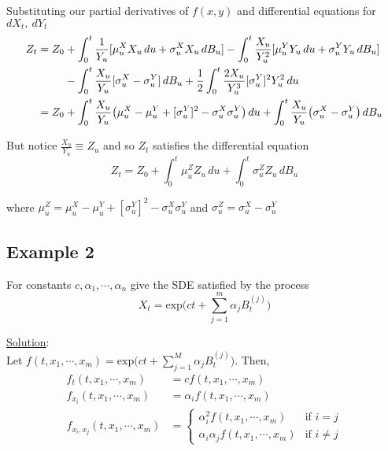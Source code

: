 \documentclass[12pt]{article}
\begin{document}
Substituting our partial derivatives of $f(x,y)$ and differential equations for $dX_t,~dY_t$
\begin{align*}
	Z_t &= Z_0 + \int^t_0 \frac{1}{Y_u}[\mu^X_u X_u\,du + \sigma^X_u X_u\,dB_u] - \int^t_0 \frac{X_u}{Y_u^2}[\mu^Y_u Y_u\,du + \sigma^Y_u Y_u\,dB_u] \\
	&\hphantom{{}={Z_0}} - \int^t_0\frac{X_u}{Y_u}[\sigma^X_u - \sigma^Y_u]\,dB_u + \frac{1}{2}\int^t_0\frac{2X_u}{Y_u^3}[\sigma^Y_u]^2Y_u^2\,du \\
	&= Z_0 + \int^t_0 \frac{X_u}{Y_u}\big(\mu^X_u - \mu^Y_u + [\sigma^Y_u]^2 - \sigma^X_u\sigma^Y_u\big)\,du + \int^t_0 \frac{X_u}{Y_u}\big(\sigma^X_u - \sigma^Y_u\big)\,dB_u
\end{align*}

But notice $\frac{X_u}{Y_u} \equiv Z_u$ and so $Z_t$ satisfies the differential equation
\begin{equation*}
	Z_t = Z_0 + \int^t_0\mu^Z_u Z_u\,du + \int^t_0 \sigma^Z_u Z_u\,dB_u
\end{equation*}

where $\mu^Z_u = \mu^X_u - \mu^Y_u + [\sigma^Y_u]^2 - \sigma^X_u\sigma^Y_u$ and $\sigma^Z_u = \sigma^X_u - \sigma^Y_u$


\subsection{Example 2}

For constants $c,\alpha_1,\cdots,\alpha_n$ give the SDE satisfied by the process
\begin{equation*}
	X_t = \mathrm{exp}\Big(ct + \sum^m_{j=1}\alpha_jB^{(j)}_t \Big)
\end{equation*}

\underline{Solution}: \\

Let $f(t,x_1,\cdots,x_m) = \mathrm{exp}\Big(ct + \sum^M_{j=1}\alpha_jB^{(j)}_t \Big)$. Then,
\begin{align*}
	f_t(t,x_1,\cdots,x_m) &= cf(t,x_1,\cdots,x_m) \\
	f_{x_i}(t,x_1,\cdots,x_m) &= \alpha_if(t,x_1,\cdots,x_m) \\
	f_{x_i,x_j}(t,x_1,\cdots,x_m) &= 
	\begin{cases}
	 \alpha_i^2f(t,x_1,\cdots,x_m) & \text{if } i = j	 \\
	 \alpha_i\alpha_jf(t,x_1,\cdots,x_m) & \text{if } i \neq j
	\end{cases}
\end{align*}
\end{document}

